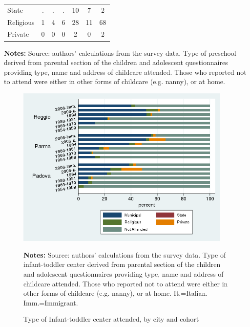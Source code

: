 \documentclass[12pt]{article}
\begin{document}
\begin{table}[ht]
\begin{center}
\begin{tabular}{l ccc|ccc}
State           &   . &   . &   . &  10 &   7 &   2 \\ 
Religious       &   1 &   4 &   6 &  28 &  11 &  68 \\ 
Private         &   0 &   0 &   0 &   2 &   0 &   2 \\ \hline
\end{tabular}
\end{center}
\raggedright{\footnotesize {{\bfseries Notes:} Source: authors' calculations from the survey data. Type of preschool derived from parental section of the children and adolescent questionnaires providing type, name and address of childcare attended. Those who reported not to attend were either in other forms of childcare (e.g. nanny), or at home.} }
\end{table}

\begin{figure}[!htb]
\caption{Type of Infant-toddler center attended, by city and cohort}
\label{fig:asiloAttend}
\begin{center}
\includegraphics[height=8cm]{asiloType-Attend.png} \\[0pt]
\end{center}
\par
{\footnotesize {{\bfseries Notes:} Source: authors' calculations from the survey data. Type of infant-toddler center derived from parental section of the children and adolescent questionnaires providing type, name and address of childcare attended. Those who reported not to attend were either in other forms of childcare (e.g. nanny), or at home. It.=Italian. Imm.=Immigrant.} }
\end{figure}
\end{document}
